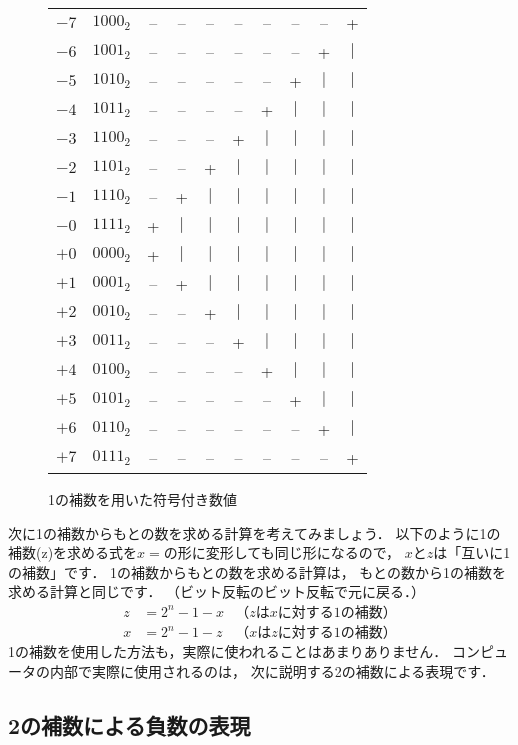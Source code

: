 \newcommand{\h}{$\vert$}
\begin{figure}[tb]
\begin{center}
{\small\tabcolsep=2mm\begin{tabular}{ r r c c c c c c c c }
$-7$  & $1000_2$ &--&--&--&--&--&--&--& +\\
$-6$  & $1001_2$ &--&--&--&--&--&--&+ &\h\\
$-5$  & $1010_2$ &--&--&--&--&--&+ &\h&\h\\
$-4$  & $1011_2$ &--&--&--&--&+ &\h&\h&\h\\
$-3$  & $1100_2$ &--&--&--&+ &\h&\h&\h&\h\\
$-2$  & $1101_2$ &--&--&+ &\h&\h&\h&\h&\h\\
$-1$  & $1110_2$ &--&+ &\h&\h&\h&\h&\h&\h\\
$-0$  & $1111_2$ &+ &\h&\h&\h&\h&\h&\h&\h\\
$+0$  & $0000_2$ &+ &\h&\h&\h&\h&\h&\h&\h\\
$+1$  & $0001_2$ &--&+ &\h&\h&\h&\h&\h&\h\\
$+2$  & $0010_2$ &--&--&+ &\h&\h&\h&\h&\h\\
$+3$  & $0011_2$ &--&--&--&+ &\h&\h&\h&\h\\
$+4$  & $0100_2$ &--&--&--&--&+ &\h&\h&\h\\
$+5$  & $0101_2$ &--&--&--&--&--&+ &\h&\h\\
$+6$  & $0110_2$ &--&--&--&--&--&--&+ &\h\\
$+7$  & $0111_2$ &--&--&--&--&--&--&--& +\\
\end{tabular}}
\caption{1の補数を用いた符号付き数値}
\label{fig:chap2:1sc}
\end{center}
\end{figure}

次に1の補数からもとの数を求める計算を考えてみましょう．
以下のように1の補数(z)を求める式を$x=$の形に変形しても同じ形になるので，
$x$と$z$は「互いに1の補数」です．
1の補数からもとの数を求める計算は，
もとの数から1の補数を求める計算と同じです．
（ビット反転のビット反転で元に戻る．）
{\small\begin{align*}
z &= 2^n - 1 - x &（zはxに対する1の補数） \\
x &= 2^n - 1 - z &（xはzに対する1の補数）
\end{align*}}
1の補数を使用した方法も，実際に使われることはあまりありません．
コンピュータの内部で実際に使用されるのは，
次に説明する2の補数による表現です．

\subsection{2の補数による負数の表現}\label{chap2:2c}

